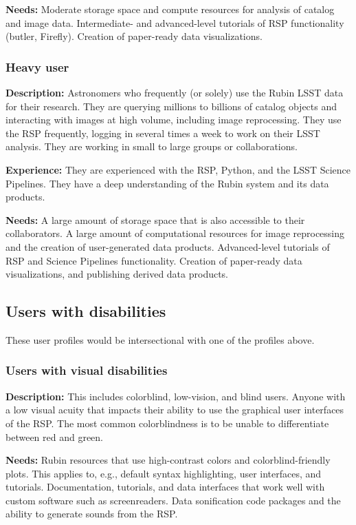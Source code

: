 \textbf{Needs:}
Moderate storage space and compute resources for analysis of catalog and image data.
Intermediate- and advanced-level tutorials of RSP functionality (butler, Firefly).
Creation of paper-ready data visualizations.

\subsubsection{Heavy user}

\textbf{Description:} 
Astronomers who frequently (or solely) use the Rubin LSST data for their research.
They are querying millions to billions of catalog objects and interacting
with images at high volume, including image reprocessing.
They use the RSP frequently, logging in several times a week to work on their LSST analysis.
They are working in small to large groups or collaborations.

\textbf{Experience:} 
They are experienced with the RSP, Python, and the LSST Science Pipelines.
They have a deep understanding of the Rubin system and its data products.

\textbf{Needs:}
A large amount of storage space that is also accessible to their collaborators.
A large amount of computational resources for image reprocessing and the
creation of user-generated data products.
Advanced-level tutorials of RSP and Science Pipelines functionality.
Creation of paper-ready data visualizations, and publishing derived data products.

\subsection{Users with disabilities}

These user profiles would be intersectional with one of the profiles above.

\subsubsection{Users with visual disabilities}

\textbf{Description:}
This includes colorblind, low-vision, and blind users.
Anyone with a low visual acuity that impacts their ability to use the 
graphical user interfaces of the RSP.
The most common colorblindness is to be unable to differentiate between red and green.

\textbf{Needs:}
Rubin resources that use high-contrast colors and colorblind-friendly plots.
This applies to, e.g., default syntax highlighting, user interfaces, and tutorials.
Documentation, tutorials, and data interfaces that work well with custom software such
as screenreaders.
Data sonification code packages and the ability to generate sounds from the RSP.

